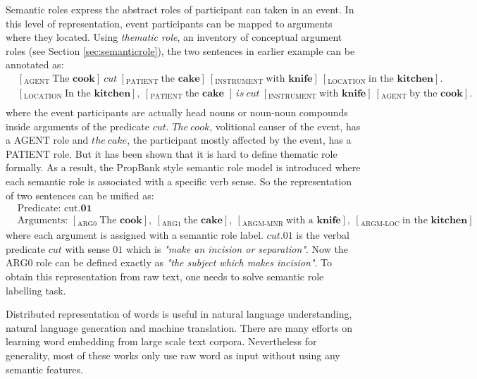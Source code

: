 \documentclass[a4paper]{article}
\begin{document}
Semantic roles express the abstract roles of participant can taken in an event. In this level of representation, event participants can be mapped to arguments where they located. Using \textit{thematic role}, an inventory of conceptual argument roles (see Section \ref{sec:semanticrole}), the two sentences in earlier example can be annotated as: 
\begin{equation*} \label{eg:thematic}
\begin{aligned}
    & [_\text{AGENT }\text{The }\textbf{cook}]\ cut\ [_\text{PATIENT }\text{the }\textbf{cake}]\ [_\text{INSTRUMENT }\text{with }\textbf{knife}]\ [_\text{LOCATION }\text{in the }\textbf{kitchen}]. \\
    & [_\text{LOCATION }\text{In the }\textbf{kitchen}],\ [_\text{PATIENT }\text{the }\textbf{cake }]\ is \ cut\ [_\text{INSTRUMENT }\text{with }\textbf{knife}]\ [_\text{AGENT }\text{by the }\textbf{cook}].\\
\end{aligned}
\end{equation*} 
where the event participants are actually head nouns or noun-noun compounds inside arguments of the predicate $cut$. $The\ cook$, volitional causer of the event, has a AGENT role and $the\ cake$, the participant mostly affected by the event, has a PATIENT role. But it has been shown that it is hard to define thematic role formally. As a result, the PropBank \citep{palmer2005proposition} style semantic role model is introduced where each semantic role is associated with a specific verb sense. So the representation of two sentences can be unified as: 
\begin{equation*} \label{eg:probank}
\begin{aligned}
    & \text{Predicate: cut.}\textbf{01} \\
    & \text{Arguments: } [_\text{ARG0 }\text{The }\textbf{cook}], \ [_\text{ARG1 }\text{the }\textbf{cake}], \ [_\text{ARGM-MNR }\text{with a }\textbf{knife}], \ [_\text{ARGM-LOC }\text{in the }\textbf{kitchen}]
\end{aligned}
\end{equation*} 
where each argument is assigned with a semantic role label. $cut.01$ is the verbal predicate $cut$ with sense $01$ which is \textit{"make an incision or separation"}. Now the ARG0 role can be defined exactly as \textit{"the subject which makes incision"}. To obtain this representation from raw text, one needs to solve semantic role labelling task. 


\noindent
Distributed representation of words is useful in natural language understanding, natural language generation and machine translation. There are many efforts on learning word embedding from large scale text corpora. Nevertheless for generality, most of these works only use raw word as input without using any semantic features. 
\end{document}
